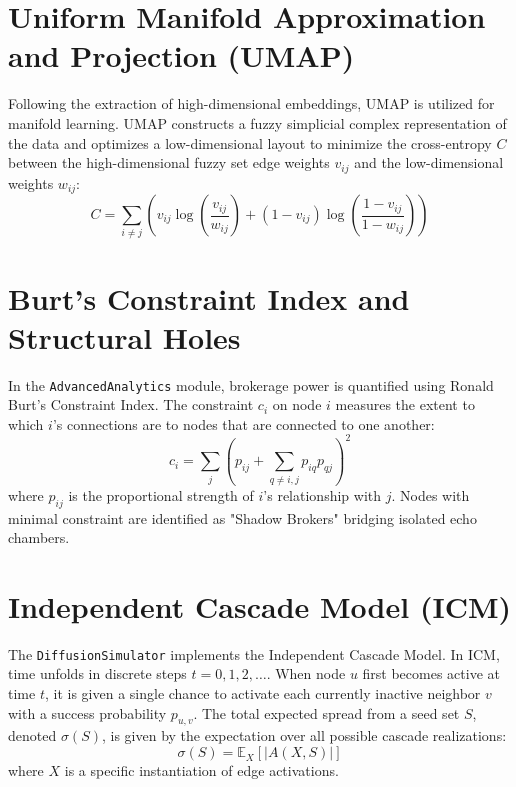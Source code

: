 \documentclass[12pt,a4paper]{report}
\begin{document}
\section{Uniform Manifold Approximation and Projection (UMAP)}
Following the extraction of high-dimensional embeddings, UMAP is utilized for manifold learning. UMAP constructs a fuzzy simplicial complex representation of the data and optimizes a low-dimensional layout to minimize the cross-entropy $C$ between the high-dimensional fuzzy set edge weights $v_{ij}$ and the low-dimensional weights $w_{ij}$:
\begin{equation}
    C = \sum_{i \neq j} \left( v_{ij} \log\left(\frac{v_{ij}}{w_{ij}}\right) + (1 - v_{ij}) \log\left(\frac{1 - v_{ij}}{1 - w_{ij}}\right) \right)
\end{equation}

\section{Burt's Constraint Index and Structural Holes}
In the \texttt{AdvancedAnalytics} module, brokerage power is quantified using Ronald Burt's Constraint Index. The constraint $c_i$ on node $i$ measures the extent to which $i$'s connections are to nodes that are connected to one another:
\begin{equation}
    c_i = \sum_{j} \left( p_{ij} + \sum_{q \neq i,j} p_{iq} p_{qj} \right)^2
\end{equation}
where $p_{ij}$ is the proportional strength of $i$'s relationship with $j$. Nodes with minimal constraint are identified as "Shadow Brokers" bridging isolated echo chambers.

\section{Independent Cascade Model (ICM)}
The \texttt{DiffusionSimulator} implements the Independent Cascade Model. In ICM, time unfolds in discrete steps $t=0, 1, 2, \dots$. When node $u$ first becomes active at time $t$, it is given a single chance to activate each currently inactive neighbor $v$ with a success probability $p_{u,v}$. The total expected spread from a seed set $S$, denoted $\sigma(S)$, is given by the expectation over all possible cascade realizations:
\begin{equation}
    \sigma(S) = \mathbb{E}_{X} [|A(X, S)|]
\end{equation}
where $X$ is a specific instantiation of edge activations.
\end{document}
